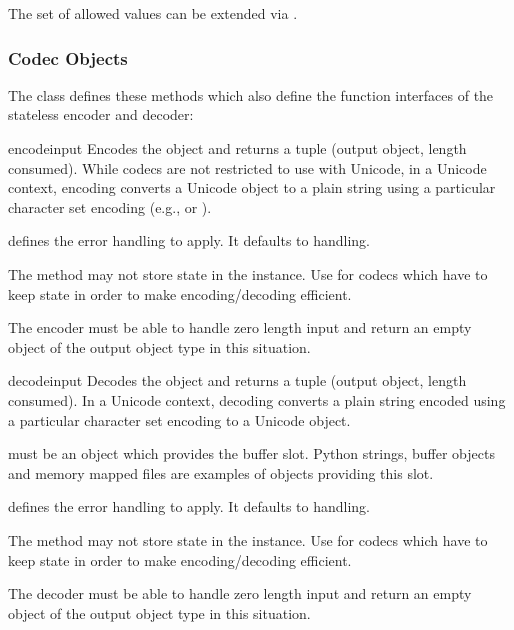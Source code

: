 The set of allowed values can be extended via .


\subsubsection{Codec Objects \label{codec-objects}}

The  class defines these methods which also define the
function interfaces of the stateless encoder and decoder:

\begin{methoddesc}{encode}{input}
  Encodes the object  and returns a tuple (output object,
  length consumed).  While codecs are not restricted to use with Unicode, in
  a Unicode context, encoding converts a Unicode object to a plain string
  using a particular character set encoding (e.g.,  or
  ).

   defines the error handling to apply. It defaults to
   handling.

  The method may not store state in the  instance. Use
   for codecs which have to keep state in order to
  make encoding/decoding efficient.

  The encoder must be able to handle zero length input and return an
  empty object of the output object type in this situation.
\end{methoddesc}

\begin{methoddesc}{decode}{input}
  Decodes the object  and returns a tuple (output object,
  length consumed).  In a Unicode context, decoding converts a plain string
  encoded using a particular character set encoding to a Unicode object.

   must be an object which provides the 
  buffer slot.  Python strings, buffer objects and memory mapped files
  are examples of objects providing this slot.

   defines the error handling to apply. It defaults to
   handling.

  The method may not store state in the  instance. Use
   for codecs which have to keep state in order to
  make encoding/decoding efficient.

  The decoder must be able to handle zero length input and return an
  empty object of the output object type in this situation.
\end{methoddesc}

